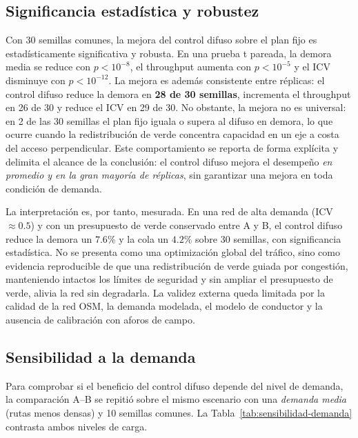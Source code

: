 \subsection{Significancia estadística y robustez}

Con 30 semillas comunes, la mejora del control difuso sobre el plan fijo es estadísticamente significativa y
robusta. En una prueba t pareada, la demora media se reduce con $p<10^{-8}$, el throughput aumenta con
$p<10^{-5}$ y el ICV disminuye con $p<10^{-12}$. La mejora es además consistente entre réplicas: el control
difuso reduce la demora en \textbf{28 de 30 semillas}, incrementa el throughput en 26 de 30 y reduce el ICV en
29 de 30. No obstante, la mejora no es universal: en 2 de las 30 semillas el plan fijo iguala o supera al
difuso en demora, lo que ocurre cuando la redistribución de verde concentra capacidad en un eje a costa del
acceso perpendicular. Este comportamiento se reporta de forma explícita y delimita el alcance de la
conclusión: el control difuso mejora el desempeño \emph{en promedio y en la gran mayoría de réplicas}, sin
garantizar una mejora en toda condición de demanda.

La interpretación es, por tanto, mesurada. En una red de alta demanda (ICV $\approx 0.5$) y con un presupuesto
de verde conservado entre A y B, el control difuso reduce la demora un $7.6\%$ y la cola un $4.2\%$ sobre 30
semillas, con significancia estadística. No se presenta como una optimización global del tráfico, sino como
evidencia reproducible de que una redistribución de verde guiada por congestión, manteniendo intactos los
límites de seguridad y sin ampliar el presupuesto de verde, alivia la red sin degradarla. La validez externa
queda limitada por la calidad de la red OSM, la demanda modelada, el modelo de conductor y la ausencia de
calibración con aforos de campo.

\subsection{Sensibilidad a la demanda}\label{subsec:sensibilidad-demanda}

Para comprobar si el beneficio del control difuso depende del nivel de demanda, la comparación A--B se repitió
sobre el mismo escenario con una \emph{demanda media} (rutas menos densas) y 10 semillas comunes. La
Tabla~\ref{tab:sensibilidad-demanda} contrasta ambos niveles de carga.

